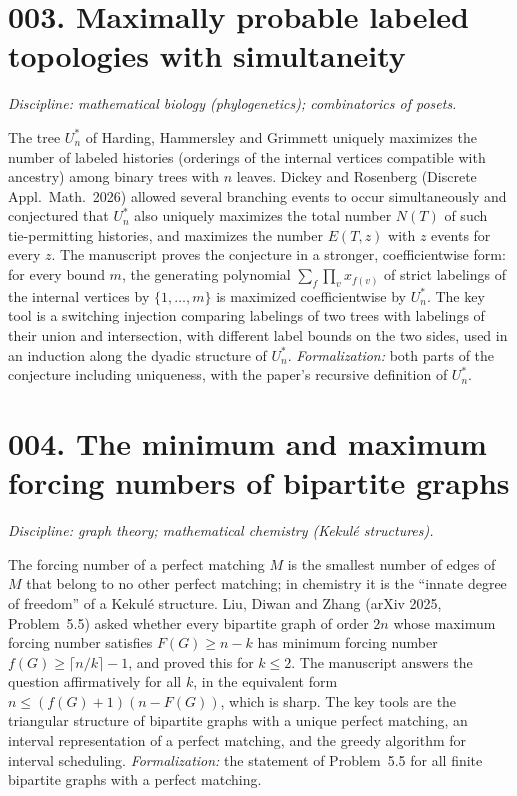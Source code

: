 \documentclass[11pt]{amsart}
\begin{document}
\section*{003. Maximally probable labeled topologies with simultaneity}
\emph{Discipline: mathematical biology (phylogenetics); combinatorics of posets.}

The tree $U^*_n$ of Harding, Hammersley and Grimmett uniquely maximizes the number of labeled histories (orderings of the internal vertices compatible with ancestry) among binary trees with $n$ leaves.
Dickey and Rosenberg (Discrete Appl.\ Math.\ 2026) allowed several branching events to occur simultaneously and conjectured that $U^*_n$ also uniquely maximizes the total number $N(T)$ of such tie-permitting histories, and maximizes the number $E(T,z)$ with $z$ events for every $z$.
The manuscript proves the conjecture in a stronger, coefficientwise form: for every bound $m$, the generating polynomial $\sum_f\prod_v x_{f(v)}$ of strict labelings of the internal vertices by $\{1,\dots,m\}$ is maximized coefficientwise by $U^*_n$.
The key tool is a switching injection comparing labelings of two trees with labelings of their union and intersection, with different label bounds on the two sides, used in an induction along the dyadic structure of $U^*_n$.
\emph{Formalization:} both parts of the conjecture including uniqueness, with the paper's recursive definition of $U^*_n$.

\section*{004. The minimum and maximum forcing numbers of bipartite graphs}
\emph{Discipline: graph theory; mathematical chemistry (Kekul\'e structures).}

The forcing number of a perfect matching $M$ is the smallest number of edges of $M$ that belong to no other perfect matching; in chemistry it is the ``innate degree of freedom'' of a Kekul\'e structure.
Liu, Diwan and Zhang (arXiv 2025, Problem~5.5) asked whether every bipartite graph of order $2n$ whose maximum forcing number satisfies $F(G)\ge n-k$ has minimum forcing number $f(G)\ge\lceil n/k\rceil-1$, and proved this for $k\le2$.
The manuscript answers the question affirmatively for all $k$, in the equivalent form $n\le(f(G)+1)(n-F(G))$, which is sharp.
The key tools are the triangular structure of bipartite graphs with a unique perfect matching, an interval representation of a perfect matching, and the greedy algorithm for interval scheduling.
\emph{Formalization:} the statement of Problem~5.5 for all finite bipartite graphs with a perfect matching.
\end{document}
